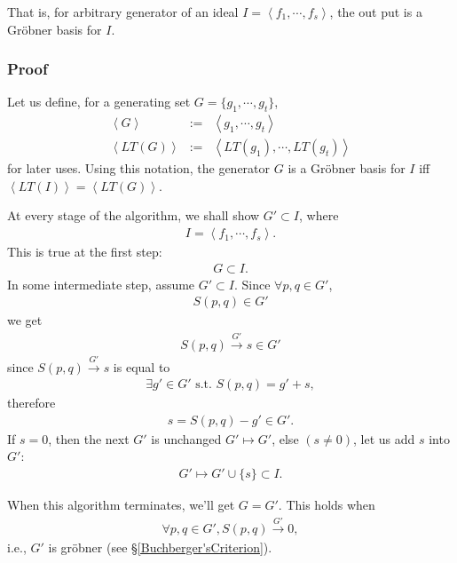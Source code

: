 \documentclass[11pt]{book}
\begin{document}
That is, for arbitrary generator of an ideal $I = \left< f_1, \cdots, f_s \right>$, the out put is a Gr\"obner basis for $I$.

\subsubsection{Proof}
Let us define, for a generating set $G = \{g_1, \cdots, g_t\}$,
\begin{eqnarray}
\left< G \right> &:=& \left< g_1, \cdots, g_t \right> \\
\left<LT(G) \right> &:=& \left< LT(g_1), \cdots, LT(g_t) \right>
\end{eqnarray}
for later uses.
Using this notation, the generator $G$ is a Gr\"obner basis for $I$ iff $\left<LT(I)\right> = \left<LT(G) \right>$.

At every stage of the algorithm, we shall show $G' \subset I$, where 
\begin{eqnarray}
I = \left< f_1, \cdots, f_s \right>.
\end{eqnarray}
This is true at the first step:
\begin{eqnarray}
G \subset I.
\end{eqnarray}
In some intermediate step, assume $G' \subset I$.
Since $\forall p,q \in G'$,
\begin{eqnarray}
S(p,q) \in G'
\end{eqnarray}
we get
\begin{eqnarray}
S(p,q) \stackrel{G'}{\to} s \in G'
\end{eqnarray}
since $S(p,q) \stackrel{G'}{\to} s$ is equal to
\begin{eqnarray}
\exists g' \in G' \text{ s.t. } S(p,q) = g' + s,
\end{eqnarray}
therefore
\begin{eqnarray}
s = S(p,q) -g' \in G'.
\end{eqnarray}
If $s = 0$, then the next $G'$ is unchanged $G' \mapsto G'$, else $(s \neq 0)$, let us add $s$ into $G'$:
\begin{eqnarray}
G' \mapsto G' \cup \{ s \} \subset I.
\end{eqnarray}

When this algorithm terminates, we'll get $G=G'$.
This holds when
\begin{eqnarray}
\forall p, q \in G', S(p,q) \stackrel{G'}{\to} 0,
\end{eqnarray}
i.e., $G'$ is gr\"obner (see \S\ref{Buchberger'sCriterion}).
\end{document}
